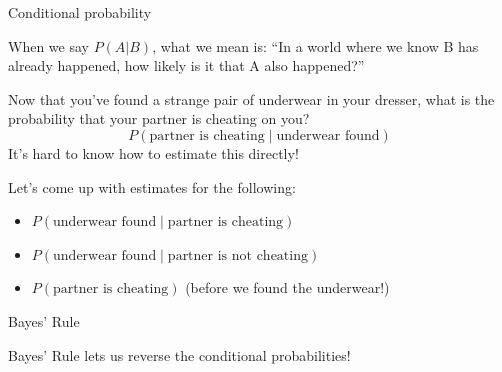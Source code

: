 \documentclass{beamer}\usepackage[]{graphicx}\usepackage[]{color}
\begin{document}
\begin{darkframes}
    \begin{frame}{Conditional probability}
      \begin{center}
        When we say $P(A|B)$, what we mean is:
        \bigskip
        ``In a world where we know B has already happened, how likely is it that A also happened?''
      \end{center}
    \end{frame}
    
    \begin{frame}
    \end{frame}

    \begin{frame}
    \end{frame}

    \begin{frame}
      \begin{center}
        Now that you’ve found a strange pair of underwear in your dresser, what is the probability that your partner is cheating on you?
        \bigskip
        \[ P(\text{partner is cheating} \mid \text{underwear found}) \]
        \pause\bigskip
        It's hard to know how to estimate this directly!
      \end{center}
    \end{frame}

    \begin{frame}
      Let's come up with estimates for the following:
      \begin{itemize}[<+->]
        \item $P(\text{underwear found} \mid \text{partner is cheating})$
        \item $P(\text{underwear found} \mid \text{partner is not cheating})$
        \item $P(\text{partner is cheating})$ (before we found the underwear!)
      \end{itemize}
    \end{frame}

    \begin{frame}{Bayes' Rule}
      \begin{center}
        Bayes' Rule lets us reverse the conditional probabilities!
        

\end{center}
\end{frame}
\end{darkframes}
\end{document}
